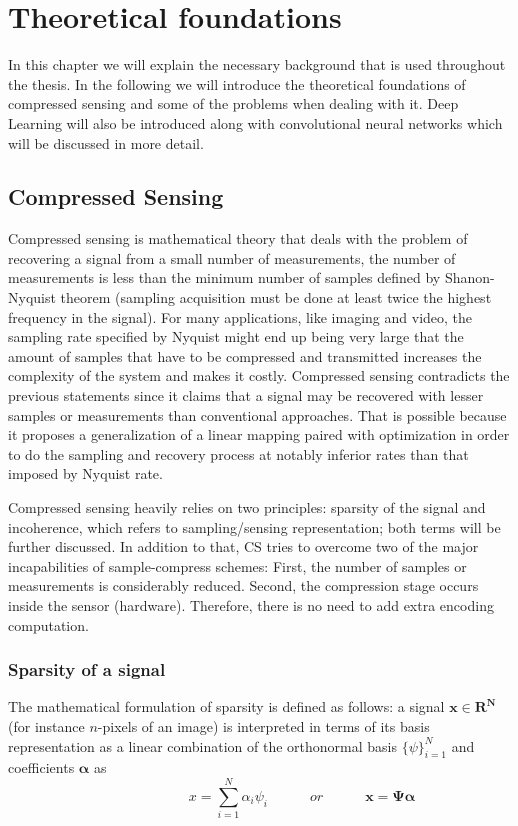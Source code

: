 \chapter{Theoretical foundations}
In this chapter we will explain the necessary background that is used throughout the thesis. In the following we will introduce the theoretical foundations of compressed sensing and some of the problems when dealing with it. Deep Learning will also be introduced along with convolutional neural networks which will be discussed in more detail.  

\section{Compressed Sensing}

Compressed sensing is mathematical theory that deals with the problem of recovering a signal from a small number of measurements, the number of measurements is less than the minimum number of samples defined by Shanon-Nyquist theorem (sampling acquisition must be done at least twice the highest frequency in the signal). For many applications, like imaging and video, the sampling rate specified by Nyquist might end up being very large that the amount of samples that have to be compressed and transmitted increases the complexity of the system and makes it costly. Compressed sensing contradicts the previous statements since it claims that a signal may be recovered with lesser samples or measurements than conventional approaches. That is possible because it proposes a generalization of a linear mapping paired with optimization in order to do the sampling and recovery process at notably inferior rates than that imposed by Nyquist rate. \

Compressed sensing heavily relies on two principles: sparsity of the signal and incoherence, which refers to sampling/sensing representation; both terms will be further discussed. In addition to that, CS tries to overcome two of the major incapabilities of sample-compress schemes: First, the number of samples or measurements is considerably reduced. Second, the compression stage occurs inside the sensor (hardware). Therefore, there is no need to add extra encoding computation.

\FloatBarrier

\subsection{Sparsity of a signal}
The mathematical formulation of sparsity is defined as follows: a signal $\mathbf{x \in R^N}$ (for instance $n$-pixels of an image) is interpreted in terms of its basis representation as a linear combination of the orthonormal basis $\{\psi\}_{i=1}^{N}$ and coefficients $\mathbf{\alpha}$ as  
\begin{equation} \label{eq:signal}
\hspace{3em} \hspace{3em} x = \sum\limits_{i=1}^N \alpha_{i} \psi_{i} \hspace{3em} or \hspace{3em} \mathbf{x = \Psi \alpha}
\end{equation} 

